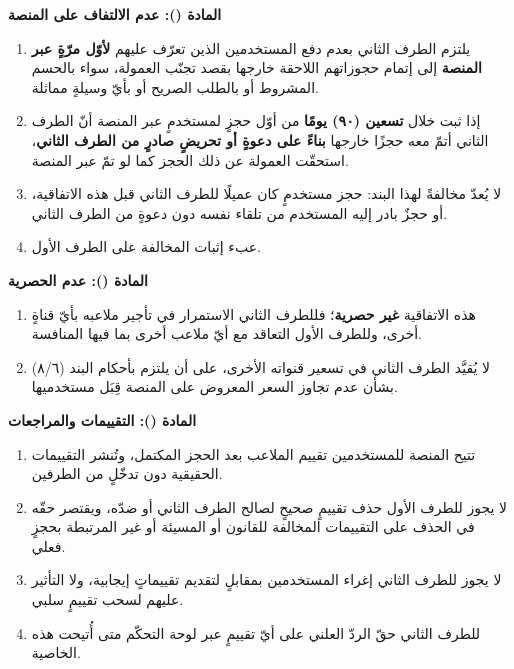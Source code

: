 \documentclass[12pt,a4paper]{article}
\newcounter{bndc}
\newcommand{\bnd}[1]{%
  \vspace{10pt}\par\noindent
  {\color{teal}\bfseries\large المادة (\arabic{bndc}): #1}%
  \stepcounter{bndc}%
  \par\vspace{2pt}\noindent{\color{rule}\rule{\linewidth}{0.6pt}}\par\vspace{4pt}%
}
\newcommand{\mlh}[1]{{\bfseries #1}}
\newenvironment{bnditems}
  {\begin{enumerate}[label=\arabic{bndc}.\arabic*,leftmargin=1.6em,itemsep=3pt,topsep=3pt]}
  {\end{enumerate}}
\begin{document}
\bnd{عدم الالتفاف على المنصة}\label{art:bypass}
\begin{bnditems}
  \item يلتزم الطرف الثاني بعدم دفع المستخدمين الذين تعرّف عليهم \mlh{لأوّل مرّةٍ عبر المنصة} إلى إتمام حجوزاتهم اللاحقة خارجها بقصد تجنّب العمولة، سواء بالحسم المشروط أو بالطلب الصريح أو بأيّ وسيلةٍ مماثلة.
  \item إذا ثبت خلال \mlh{تسعين (٩٠) يومًا} من أوّل حجزٍ لمستخدمٍ عبر المنصة أنّ الطرف الثاني أتمّ معه حجزًا خارجها \mlh{بناءً على دعوةٍ أو تحريضٍ صادرٍ من الطرف الثاني}، استحقّت العمولة عن ذلك الحجز كما لو تمّ عبر المنصة.
  \item لا يُعدّ مخالفةً لهذا البند: حجز مستخدمٍ كان عميلًا للطرف الثاني قبل هذه الاتفاقية، أو حجزٌ بادر إليه المستخدم من تلقاء نفسه دون دعوةٍ من الطرف الثاني.
  \item عبء إثبات المخالفة على الطرف الأول.
\end{bnditems}

\bnd{عدم الحصرية}
\begin{bnditems}
  \item هذه الاتفاقية \mlh{غير حصرية}؛ فللطرف الثاني الاستمرار في تأجير ملاعبه بأيّ قناةٍ أخرى، وللطرف الأول التعاقد مع أيّ ملاعب أخرى بما فيها المنافسة.
  \item لا يُقيَّد الطرف الثاني في تسعير قنواته الأخرى، على أن يلتزم بأحكام البند (٨/٦) بشأن عدم تجاوز السعر المعروض على المنصة قِبَل مستخدميها.
\end{bnditems}

\bnd{التقييمات والمراجعات}
\begin{bnditems}
  \item تتيح المنصة للمستخدمين تقييم الملاعب بعد الحجز المكتمل، وتُنشر التقييمات الحقيقية دون تدخّلٍ من الطرفين.
  \item لا يجوز للطرف الأول حذف تقييمٍ صحيحٍ لصالح الطرف الثاني أو ضدّه، ويقتصر حقّه في الحذف على التقييمات المخالفة للقانون أو المسيئة أو غير المرتبطة بحجزٍ فعلي.
  \item لا يجوز للطرف الثاني إغراء المستخدمين بمقابلٍ لتقديم تقييماتٍ إيجابية، ولا التأثير عليهم لسحب تقييمٍ سلبي.
  \item للطرف الثاني حقّ الردّ العلني على أيّ تقييمٍ عبر لوحة التحكّم متى أُتيحت هذه الخاصية.
\end{bnditems}
\end{document}
